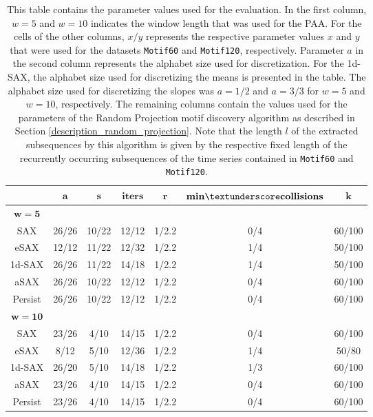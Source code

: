 \begin{table}[H]
\centering
\begin{tabular}{ccccccc} 
\toprule
 & $\mathbf{a}$ & $\mathbf{s}$ & $\mathbf{iters}$ & $\mathbf{r}$ & $\mathbf{min \textunderscore collisions}$ & $\mathbf{k}$ \\
\midrule
$\mathbf{w = 5}$ &  &  &  &  & \\
\ac{SAX} & 26/26 & 10/22 & 12/12 & 1/2.2 & 0/4 & 60/100 \\
\ac{eSAX} & 12/12 & 11/22 & 12/32 & 1/2.2 & 1/4 & 50/100 \\
\ac{1d-SAX} & 26/26 & 11/22 & 14/18 & 1/2.2 & 1/4 & 50/100 \\
\ac{aSAX} & 26/26 & 10/22 & 12/12 & 1/2.2 & 0/4 & 60/100 \\
Persist & 26/26 & 10/22 & 12/12 & 1/2.2 & 0/4 & 60/100 \\
\midrule
$\mathbf{w = 10}$ &  &  &  &  & \\
\ac{SAX} & 23/26 & 4/10 & 14/15 & 1/2.2 & 0/4 & 60/100 \\
\ac{eSAX} & 8/12 & 5/10 & 12/36 & 1/2.2 & 1/4 & 50/80 \\
\ac{1d-SAX} & 26/20 & 5/10 & 14/18 & 1/2.2 & 1/3 & 60/100 \\
\ac{aSAX} & 23/26 & 4/10 & 14/15 & 1/2.2 & 0/4 & 60/100 \\
Persist & 23/26 & 4/10 & 14/15 & 1/2.2 & 0/4 & 60/100 \\
\bottomrule
\end{tabular}
\vspace*{0.5cm}
\caption[Evaluation - Parameters for the Random Projection]{This table contains the parameter values used for the evaluation. In the first column, $w = 5$ and $w = 10$ indicates the window length that was used for the \ac{PAA}. For the cells of the other columns, $x/y$ represents the respective parameter values $x$ and $y$ that were used for the datasets \texttt{Motif60} and \texttt{Motif120}, respectively. Parameter $a$ in the second column represents the alphabet size used for discretization. For the \ac{1d-SAX}, the alphabet size used for discretizing the means is presented in the table. The alphabet size used for discretizing the slopes was $a = 1/2$ and $a = 3/3$ for $w = 5$ and $w = 10$, respectively. The remaining columns contain the values used for the parameters of the Random Projection motif discovery algorithm as described in Section \ref{description_random_projection}. Note that the length $l$ of the extracted subsequences by this algorithm is given by the respective fixed length of the recurrently occurring subsequences of the time series contained in \texttt{Motif60} and \texttt{Motif120}.}
\label{tab:params_random_projection}
\end{table}

